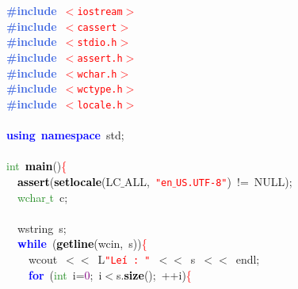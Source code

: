 
{\ttfamily \raggedright {
\noindent
\mbox{}\textbf{\textcolor{RoyalBlue}{\#include}}\ \texttt{\textcolor{Red}{$<$iostream$>$}} \\
\mbox{}\textbf{\textcolor{RoyalBlue}{\#include}}\ \texttt{\textcolor{Red}{$<$cassert$>$}} \\
\mbox{}\textbf{\textcolor{RoyalBlue}{\#include}}\ \texttt{\textcolor{Red}{$<$stdio.h$>$}} \\
\mbox{}\textbf{\textcolor{RoyalBlue}{\#include}}\ \texttt{\textcolor{Red}{$<$assert.h$>$}} \\
\mbox{}\textbf{\textcolor{RoyalBlue}{\#include}}\ \texttt{\textcolor{Red}{$<$wchar.h$>$}} \\
\mbox{}\textbf{\textcolor{RoyalBlue}{\#include}}\ \texttt{\textcolor{Red}{$<$wctype.h$>$}} \\
\mbox{}\textbf{\textcolor{RoyalBlue}{\#include}}\ \texttt{\textcolor{Red}{$<$locale.h$>$}} \\
\mbox{} \\
\mbox{}\textbf{\textcolor{Blue}{using}}\ \textbf{\textcolor{Blue}{namespace}}\ std\textcolor{BrickRed}{;} \\
\mbox{} \\
\mbox{}\textcolor{ForestGreen}{int}\ \textbf{\textcolor{Black}{main}}\textcolor{BrickRed}{()}\textcolor{Red}{\{} \\
\mbox{}\ \ \textbf{\textcolor{Black}{assert}}\textcolor{BrickRed}{(}\textbf{\textcolor{Black}{setlocale}}\textcolor{BrickRed}{(}LC$\_$ALL\textcolor{BrickRed}{,}\ \texttt{\textcolor{Red}{"{}en$\_$US.UTF-8"{}}}\textcolor{BrickRed}{)}\ \textcolor{BrickRed}{!=}\ NULL\textcolor{BrickRed}{);} \\
\mbox{}\ \ \textcolor{ForestGreen}{wchar$\_$t}\ c\textcolor{BrickRed}{;} \\
\mbox{} \\
\mbox{}\ \ wstring\ s\textcolor{BrickRed}{;} \\
\mbox{}\ \ \textbf{\textcolor{Blue}{while}}\ \textcolor{BrickRed}{(}\textbf{\textcolor{Black}{getline}}\textcolor{BrickRed}{(}wcin\textcolor{BrickRed}{,}\ s\textcolor{BrickRed}{))}\textcolor{Red}{\{} \\
\mbox{}\ \ \ \ wcout\ \textcolor{BrickRed}{$<$$<$}\ L\texttt{\textcolor{Red}{"{}Leí\ :\ "{}}}\ \textcolor{BrickRed}{$<$$<$}\ s\ \textcolor{BrickRed}{$<$$<$}\ endl\textcolor{BrickRed}{;} \\
\mbox{}\ \ \ \ \textbf{\textcolor{Blue}{for}}\ \textcolor{BrickRed}{(}\textcolor{ForestGreen}{int}\ i\textcolor{BrickRed}{=}\textcolor{Purple}{0}\textcolor{BrickRed}{;}\ i\textcolor{BrickRed}{$<$}s\textcolor{BrickRed}{.}\textbf{\textcolor{Black}{size}}\textcolor{BrickRed}{();}\ \textcolor{BrickRed}{++}i\textcolor{BrickRed}{)}\textcolor{Red}{\{} \\
}}
